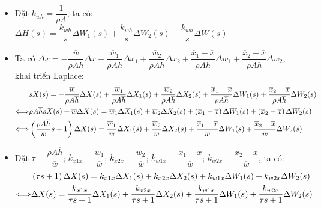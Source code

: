 \begin{itemize}
        \item Đặt $k_{wh} = \dfrac{1}{\rho A}$, ta có: $\Delta H(s) = \dfrac{k_{wh}}{s} \Delta W_1(s) + \dfrac{k_{wh}}{s} \Delta W_2(s) - \dfrac{k_{wh}}{s} \Delta W(s)$
        \item Ta có $\Delta \dot{x} = - \dfrac{\overline{w}}{\rho A \overline{h}} \Delta x + \dfrac{\overline{w}_1}{\rho A \overline{h}} \Delta x_1 + \dfrac{\overline{w}_2}{\rho A \overline{h}} \Delta x_2 + \dfrac{\overline{x}_1 - \overline{x}}{\rho A \overline{h}} \Delta w_1 + \dfrac{\overline{x}_2 - \overline{x}}{\rho A \overline{h}} \Delta w_2$, khai triển Laplace:
            \begin{align*}
                & s X(s) = - \dfrac{\overline{w}}{\rho A \overline{h}} \Delta X(s) + \dfrac{\overline{w}_1}{\rho A \overline{h}} \Delta X_1(s) + \dfrac{\overline{w}_2}{\rho A \overline{h}} \Delta X_2(s) + \dfrac{\overline{x}_1 - \overline{x}}{\rho A \overline{h}} \Delta W_1(s) + \dfrac{\overline{x}_2 - \overline{x}}{\rho A \overline{h}} \Delta W_2(s) \\
                \Longleftrightarrow & \rho A \overline{h} s X(s) + \overline{w} \Delta X(s) = \overline{w}_1 \Delta X_1(s) + \overline{w}_2 \Delta X_2(s) + \left({\overline{x}_1 - \overline{x}}\right) \Delta W_1(s) + \left({\overline{x}_2 - \overline{x}}\right) \Delta W_2(s)\\
                \Longleftrightarrow & \left({\dfrac{\rho A \overline{h}}{\overline{w}}s + 1}\right)\Delta X(s) = \dfrac{\overline{w}_1}{\overline{w}} \Delta X_1(s) + \dfrac{\overline{w}_2}{\overline{w}} \Delta X_2(s) + \dfrac{\overline{x}_1 - \overline{x}}{\overline{w}} \Delta W_1(s) + \dfrac{\overline{x}_2 - \overline{x}}{\overline{w}} \Delta W_2(s)
            \end{align*}
        \item Đặt $\tau = \dfrac{\rho A \overline{h}}{\overline{w}}$; $k_{x1x} = \dfrac{\overline{w}_1}{\overline{w}}$; $k_{x2x} = \dfrac{\overline{w}_2}{\overline{w}}$; $k_{w1x} = \dfrac{\overline{x}_1 - \overline{x}}{\overline{w}}$; $k_{w2x} = \dfrac{\overline{x}_2 - \overline{x}}{\overline{w}}$, ta có:
            \begin{align*}
                & \pfm{\tau s + 1}\Delta X(s) = k_{x1x} \Delta X_1(s) + k_{x2x} \Delta X_2(s) + k_{w1x} \Delta W_1(s) + k_{w2x} \Delta W_2(s) \\
                \Longleftrightarrow & \Delta X(s) = \dfrac{k_{x1x}}{\tau s + 1} \Delta X_1(s) + \dfrac{k_{x2x}}{\tau s + 1} \Delta X_2(s) + \dfrac{k_{w1x}}{\tau s + 1} \Delta W_1(s) + \dfrac{k_{w2x}}{\tau s + 1} \Delta W_2(s)

\end{align*}
\end{itemize}
